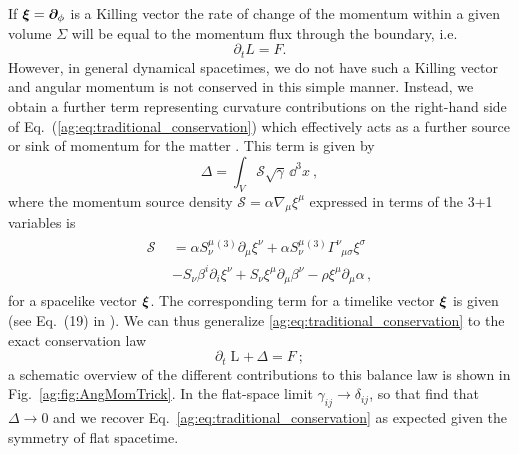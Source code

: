 If $\boldsymbol{\xi} = \boldsymbol{\partial}_\phi$ is a Killing vector the rate of change of the momentum
within a given volume $\Sigma$ will be equal to the momentum flux through the
boundary, i.e.
\begin{equation} \label{ag:eq:traditional_conservation}
    \partial_t {L} = {F}.
\end{equation}
However, in general dynamical spacetimes, we do not have such
a Killing vector and angular momentum is not conserved in this simple manner.
Instead, we obtain a further term representing curvature contributions on the right-hand side of Eq.~(\ref{ag:eq:traditional_conservation})
which effectively acts as a further source or sink of momentum for the matter \cite{Croft:2022gks,Clough:2021qlv}. This term is given by
\begin{equation}
    \mathbin{{\Delta = \int_{V} \mathcal{S} \sqrt{\gamma }\,
    \dd^3x}}~,
\end{equation}
where the momentum source density $\mathcal{S}=\alpha\nabla_{\mu}\xi^{\mu}$ expressed in terms
of the 3+1 variables is
\begin{align}
    \begin{split}\mathcal{S} &= \alpha S^\mu_{\nu}{}^{(3)}\partial_\mu \xi^\nu + \alpha S^\mu_{\nu} {}^{(3)}\Gamma^\nu_{\,\,\,\mu \sigma} \xi^\sigma \\ \quad &- S_\nu \beta^i \partial_i \xi^\nu  + S_\nu \xi^\mu \partial_\mu \beta^\nu - \rho \xi^\mu \partial_\mu \alpha\,, \end{split}
\end{align}
for a spacelike vector $\boldsymbol\xi$. The corresponding term
for a timelike vector $\boldsymbol\xi$ is given (see Eq.~(19) in \cite{Clough:2021qlv}).
We can thus generalize \ref{ag:eq:traditional_conservation} to the exact conservation law
\begin{equation}
    \partial_t\mathbin{{L}} +\,
    \mathbin{{\Delta}} =
    \mathbin{F}~;\label{ag:eqn:conserved_ang}
\end{equation}
a schematic overview of the different contributions to this balance
law is shown in Fig.~\ref{ag:fig:AngMomTrick}. In the flat-space limit $\gamma_{ij}
\rightarrow \delta_{ij}$, so that
find that ${{\Delta}}\rightarrow 0$ and we recover Eq.~\ref{ag:eq:traditional_conservation} as expected given the
symmetry of flat spacetime.

